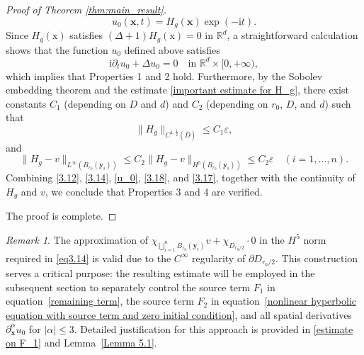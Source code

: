 \documentclass[11pt,reqno,oneside]{amsart}
\numberwithin{equation}{section}
\theoremstyle{definition}
\theoremstyle{remark}
\newtheorem{remark}[theorem]{Remark}
\numberwithin{equation}{section}
\begin{document}
\begin{proof}[Proof of Theorem \ref{thm:main_result}]
\begin{equation}
			u_0(\mathbf{x},t) = H_g(\mathbf{x}) \exp(-\mathrm{i}  t).
		\end{equation}
	Since $H_g(\mathrm{x})$ satisfies $(\Delta+1)H_g(\mathrm{x})=0$ in $\mathbb{R}^d$, a straightforward calculation shows that the function $u_0$ defined above satisfies 
		\[
		\mathrm{i}\partial_t u_0 + \Delta u_0 = 0 \quad \text{in } \mathbb{R}^d \times [0,+\infty),
		\] 
		which implies that Properties 1 and 2 hold. Furthermore, by the Sobolev embedding theorem and the estimate \eqref{important estimate for H_g}, there exist constants $C_1$ (depending on $D$ and $d$) and $C_2$ (depending on $r_0$, $D$, and $d$) such that
		\begin{equation}\label{3.18}
			\| H_g \|_{C^{1,\frac{1}{2}}(\overline{D})} \leqslant C_1 \varepsilon,
		\end{equation}
		and
		\begin{equation}\label{3.17}
			\| H_g - v \|_{L^{\infty}(B_{r_0}(\mathbf{y}_i))} \leqslant C_2	\| H_g - v \|_{H^5(B_{r_0}(\mathbf{y}_i))}\leqslant C_2 \varepsilon \quad (i=1,\dots,n).
		\end{equation}	
		Combining \eqref{3.12}, \eqref{3.14}, \eqref{u_0}, \eqref{3.18}, and \eqref{3.17}, together with the continuity of $H_g$ and $v$, we conclude that Properties 3 and 4 are verified. 
	
		The proof is complete.
	\end{proof}
	
	\begin{remark}
		The approximation of $\chi_{\bigcup_{i=1}^n B_{r_0}(\mathbf{y}_i)} v + \chi_{D_{r_0/2}} \cdot 0$ in the $H^5$ norm required in \eqref{eq3.14} is valid due to the $C^\infty$ regularity of $\partial D_{r_0/2}$. This construction serves a critical purpose: the resulting estimate will be employed in the subsequent section to separately control the source term $F_1$ in equation~\eqref{remaining term},  the source term $F_2$ in equation~\eqref{nonlinear hyperbolic equation with source term and zero initial condition}, and all spatial derivatives $\partial_{\mathbf{x}}^{\alpha} u_0$ for $|\alpha|\leqslant 3$. Detailed justification for this approach is provided in \eqref{estimate on F_1} and Lemma~\ref{Lemma 5.1}.
	\end{remark}
	
\end{document}
